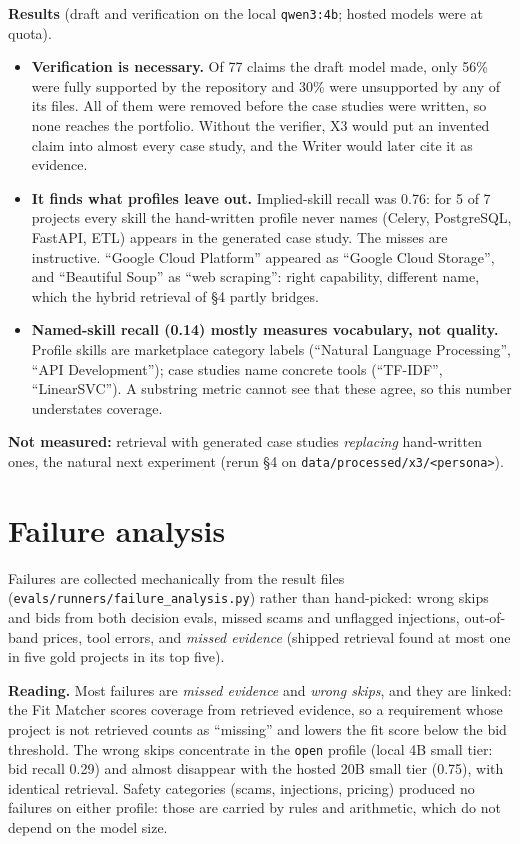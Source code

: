 \documentclass[10pt,a4paper]{article}
\newcommand{\code}[1]{\texttt{\small #1}}
\newcommand{\tbl}[3][]{\begin{table}[h!]\centering\caption{#2}#1\adjustbox{max width=\linewidth}{\small}\par\vspace{1pt}{\scriptsize}\end{table}}
\begin{document}
\textbf{Results} (draft and verification on the local \code{qwen3:4b}; hosted models were at quota).
\begin{itemize}
\item \textbf{Verification is necessary.} Of 77 claims the draft model made, only 56\% were fully supported by the repository and 30\% were unsupported by any of its files. All of them were removed before the case studies were written, so none reaches the portfolio. Without the verifier, X3 would put an invented claim into almost every case study, and the Writer would later cite it as evidence.
\item \textbf{It finds what profiles leave out.} Implied-skill recall was 0.76: for 5 of 7 projects every skill the hand-written profile never names (Celery, PostgreSQL, FastAPI, ETL) appears in the generated case study. The misses are instructive. ``Google Cloud Platform'' appeared as ``Google Cloud Storage'', and ``Beautiful Soup'' as ``web scraping'': right capability, different name, which the hybrid retrieval of \S4 partly bridges.
\item \textbf{Named-skill recall (0.14) mostly measures vocabulary, not quality.} Profile skills are marketplace category labels (``Natural Language Processing'', ``API Development''); case studies name concrete tools (``TF-IDF'', ``LinearSVC''). A substring metric cannot see that these agree, so this number understates coverage.
\end{itemize}
\textbf{Not measured:} retrieval with generated case studies \emph{replacing} hand-written ones, the natural next experiment (rerun \S4 on \code{data/processed/x3/<persona>}).

\section{Failure analysis}

Failures are collected mechanically from the result files (\code{evals/runners/failure\_analysis.py}) rather than hand-picked: wrong skips and bids from both decision evals, missed scams and unflagged injections, out-of-band prices, tool errors, and \emph{missed evidence} (shipped retrieval found at most one in five gold projects in its top five).

\tbl{Failure taxonomy over the dev runs, with the fix tried and whether it worked.}{failures}

\textbf{Reading.} Most failures are \emph{missed evidence} and \emph{wrong skips}, and they are linked: the Fit Matcher scores coverage from retrieved evidence, so a requirement whose project is not retrieved counts as ``missing'' and lowers the fit score below the bid threshold. The wrong skips concentrate in the \code{open} profile (local 4B small tier: bid recall 0.29) and almost disappear with the hosted 20B small tier (0.75), with identical retrieval. Safety categories (scams, injections, pricing) produced no failures on either profile: those are carried by rules and arithmetic, which do not depend on the model size.
\end{document}
